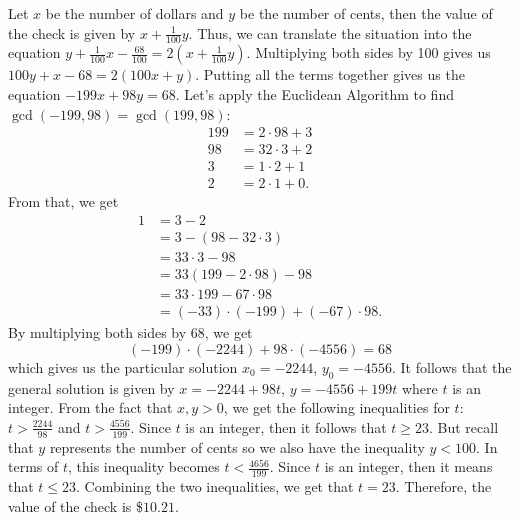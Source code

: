 \begin{solution}
    Let $x$ be the number of dollars and $y$ be the number of cents, then the value of the check is given by $x + \frac{1}{100}y$. Thus, we can translate the situation into the equation $y + \frac{1}{100}x - \frac{68}{100} = 2(x + \frac{1}{100}y)$. Multiplying both sides by 100 gives us $100y + x - 68 = 2(100x + y)$. Putting all the terms together gives us the equation $- 199x + 98y = 68$. Let's apply the Euclidean Algorithm to find $\gcd(-199, 98) = \gcd(199, 98)$:
    \begin{align*}
        199 &= 2\cdot 98 + 3 \\
        98 &= 32 \cdot 3 + 2 \\
        3 &= 1 \cdot 2 + 1 \\
        2 &= 2 \cdot 1 + 0.
    \end{align*}
    From that, we get
    \begin{align*}
        1 &= 3 - 2 \\
        &= 3 - (98 - 32\cdot 3) \\
        &= 33 \cdot 3 - 98 \\
        &= 33(199 - 2\cdot 98) - 98 \\
        &= 33 \cdot 199 - 67 \cdot 98 \\
        &= (-33) \cdot (-199) + (-67) \cdot 98.
    \end{align*}
    By multiplying both sides by 68, we get
    $$(-199)\cdot (-2244) + 98 \cdot (-4556) = 68$$
    which gives us the particular solution $x_0 = -2244$, $y_0 = -4556$. It follows that the general solution is given by $x = -2244 + 98t$, $y = -4556 + 199t$ where $t$ is an integer. From the fact that $x,y > 0$, we get the following inequalities for $t$: $t > \frac{2244}{98}$ and $t > \frac{4556}{199}$. Since $t$ is an integer, then it follows that $t \geq 23$. But recall that $y$ represents the number of cents so we also have the inequality $y < 100$. In terms of $t$, this inequality becomes $t < \frac{4656}{199}$. Since $t$ is an integer, then it means that $t \leq 23$. Combining the two inequalities, we get that $t = 23$. Therefore, the value of the check is \$$10.21$. \\
\end{solution}

